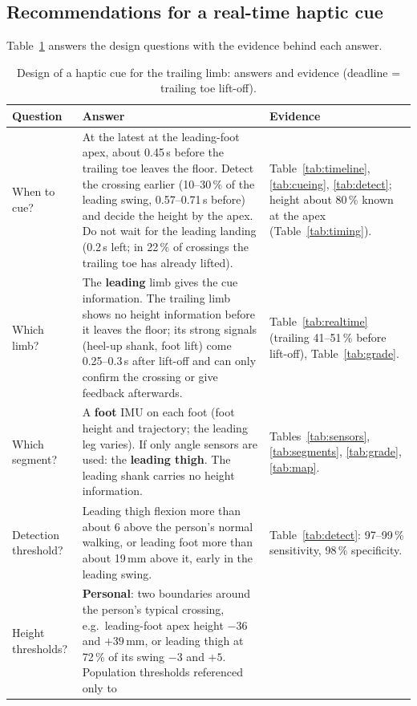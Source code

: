 \subsection{Recommendations for a real-time haptic cue}
\label{sec:haptic-reco}

Table~\ref{tab:design} answers the design questions with the evidence behind each answer.

\begin{table}[htbp]
\centering
\caption{Design of a haptic cue for the trailing limb: answers and evidence (deadline = trailing toe lift-off).}
\label{tab:design}
\footnotesize
\begin{tabular}{@{}p{2.6cm} p{7.4cm} p{5.6cm}@{}}
\toprule
\textbf{Question} & \textbf{Answer} & \textbf{Evidence} \\
\midrule
When to cue? & At the latest at the leading-foot apex, about 0.45\,s before the trailing toe leaves the floor. Detect the crossing earlier
(10--30\,\% of the leading swing, 0.57--0.71\,s before) and decide the height by the apex. Do not wait for the leading landing
(0.2\,s left; in 22\,\% of crossings the trailing toe has already lifted). &
Table~\ref{tab:timeline}, \ref{tab:cueing}, \ref{tab:detect}; height about 80\,\% known at the apex (Table~\ref{tab:timing}). \\
\addlinespace
Which limb? & The \textbf{leading} limb gives the cue information. The trailing limb shows no height information before it leaves the
floor; its strong signals (heel-up shank, foot lift) come 0.25--0.3\,s after lift-off and can only confirm the crossing or give feedback
afterwards. & Table~\ref{tab:realtime} (trailing 41--51\,\% before lift-off), Table~\ref{tab:grade}. \\
\addlinespace
Which segment? & A \textbf{foot} IMU on each foot (foot height and trajectory; the leading leg varies). If only angle sensors are used:
the \textbf{leading thigh}. The leading shank carries no height information. & Tables~\ref{tab:sensors}, \ref{tab:segments},
\ref{tab:grade}, \ref{tab:map}. \\
\addlinespace
Detection threshold? & Leading thigh flexion more than about 6\textdegree{} above the person's normal walking, or leading foot more than
about 19\,mm above it, early in the leading swing. & Table~\ref{tab:detect}: 97--99\,\% sensitivity, 98\,\% specificity. \\
\addlinespace
Height thresholds? & \textbf{Personal}: two boundaries around the person's typical crossing, e.g.\ leading-foot apex height $-36$ and
$+39$\,mm, or leading thigh at 72\,\% of its swing $-3$\textdegree{} and $+5$\textdegree{}. Population thresholds referenced only to

\end{tabular}
\end{table}
